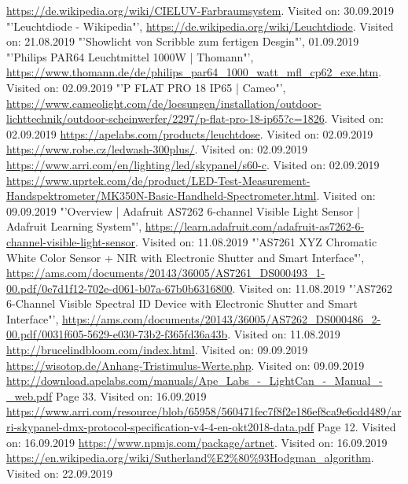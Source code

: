 \documentclass[11pt]{scrartcl}
\begin{document}
\begin{thebibliography}{xxxxxxxxxxxxxxxxxxx}
     \url{https://de.wikipedia.org/wiki/CIELUV-Farbraumsystem}. Visited on: 30.09.2019
    "'Leuchtdiode - Wikipedia"', \url{https://de.wikipedia.org/wiki/Leuchtdiode}. Visited on: 21.08.2019
    "'Showlicht von Scribble zum fertigen Desgin"', 01.09.2019
    "'Philips PAR64 Leuchtmittel 1000W | Thomann"', \url{https://www.thomann.de/de/philips_par64_1000_watt_mfl_cp62_exe.htm}. Visited on: 02.09.2019
    "'P FLAT PRO 18 IP65 | Cameo"', \url{https://www.cameolight.com/de/loesungen/installation/outdoor-lichttechnik/outdoor-scheinwerfer/2297/p-flat-pro-18-ip65?c=1826}. Visited on: 02.09.2019
     \url{https://apelabs.com/products/leuchtdose}. Visited on: 02.09.2019
     \url{https://www.robe.cz/ledwash-300plus/}. Visited on: 02.09.2019
     \url{https://www.arri.com/en/lighting/led/skypanel/s60-c}. Visited on: 02.09.2019
     \url{https://www.uprtek.com/de/product/LED-Test-Measurement-Handspektrometer/MK350N-Basic-Handheld-Spectrometer.html}. Visited on: 09.09.2019
    "'Overview | Adafruit AS7262 6-channel Visible Light Sensor | Adafruit Learning System"', \url{https://learn.adafruit.com/adafruit-as7262-6-channel-visible-light-sensor}. Visited on: 11.08.2019
    "'AS7261 XYZ Chromatic White Color Sensor + NIR with Electronic Shutter and Smart Interface"', \url{https://ams.com/documents/20143/36005/AS7261_DS000493_1-00.pdf/0e7d1f12-702e-d061-b07a-67b0b6316800}. Visited on: 11.08.2019
    "'AS7262 6-Channel Visible Spectral ID Device with Electronic Shutter and Smart Interface"', \url{https://ams.com/documents/20143/36005/AS7262_DS000486_2-00.pdf/0031f605-5629-e030-73b2-f365fd36a43b}. Visited on: 11.08.2019
     \url{http://brucelindbloom.com/index.html}. Visited on: 09.09.2019
     \url{https://wisotop.de/Anhang-Tristimulus-Werte.php}. Visited on: 09.09.2019
     \url{http://download.apelabs.com/manuals/Ape_Labs_-_LightCan_-_Manual_-_web.pdf} Page 33. Visited on: 16.09.2019
     \url{https://www.arri.com/resource/blob/65958/560471fec7f8f2e186ef8ca9e6cdd489/arri-skypanel-dmx-protocol-specification-v4-4-en-okt2018-data.pdf} Page 12. Visited on: 16.09.2019
     \url{https://www.npmjs.com/package/artnet}. Visited on: 16.09.2019
     \url{https://en.wikipedia.org/wiki/Sutherland%E2%80%93Hodgman_algorithm}. Visited on: 22.09.2019
\end{thebibliography}
\endgroup
\clearpage
\end{document}
